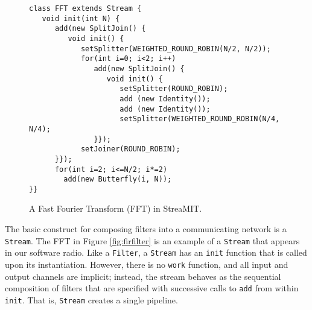 \begin{figure}
\scriptsize
\begin{verbatim}
class FFT extends Stream {
   void init(int N) {
      add(new SplitJoin() {
         void init() {
            setSplitter(WEIGHTED_ROUND_ROBIN(N/2, N/2));
            for(int i=0; i<2; i++) 
               add(new SplitJoin() {
                  void init() {
                     setSplitter(ROUND_ROBIN);
                     add (new Identity());
                     add (new Identity());
                     setSplitter(WEIGHTED_ROUND_ROBIN(N/4, N/4);
               }});
            setJoiner(ROUND_ROBIN);
      }});
      for(int i=2; i<=N/2; i*=2)
        add(new Butterfly(i, N));
}}
\end{verbatim}
\vspace{-12pt}
\caption{\protect\small A Fast Fourier Transform (FFT) in StreaMIT.
\protect\label{fig:fft}}
\vspace{-12pt}
\end{figure}

The basic construct for composing filters into a communicating network
is a {\tt Stream}.  The FFT in Figure \ref{fig:firfilter} is an
example of a {\tt Stream} that appears in our software radio.  Like a
{\tt Filter}, a {\tt Stream} has an {\tt init} function that is called
upon its instantiation.  However, there is no {\tt work} function, and
all input and output channels are implicit; instead, the stream
behaves as the sequential composition of filters that are specified
with successive calls to {\tt add} from within {\tt init}.  That is,
{\tt Stream} creates a single pipeline.

